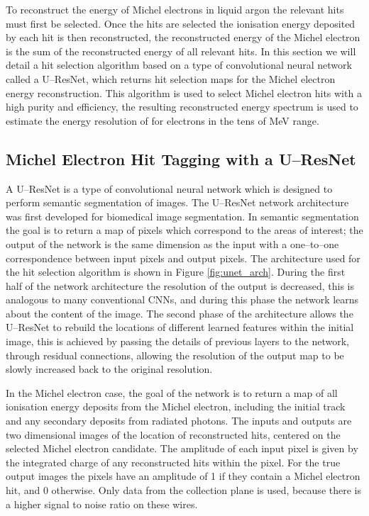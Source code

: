 To reconstruct the energy of Michel electrons in liquid argon the relevant hits
must first be selected. Once the hits are selected the ionisation energy
deposited by each hit is then reconstructed, the reconstructed energy of the 
Michel electron is the sum of the reconstructed energy of all relevant hits. In
this section we will detail a hit selection algorithm based on a type of
convolutional neural network called a U--ResNet, which returns hit selection maps 
for the Michel electron energy reconstruction. This algorithm is used to select 
Michel electron hits with a high purity and efficiency, the resulting 
reconstructed energy spectrum is used to estimate the energy resolution of 
\protodune{} for electrons in the tens of MeV range.

\subsection{Michel Electron Hit Tagging with a U--ResNet}

A U--ResNet is a type of convolutional neural network which is designed to perform
semantic segmentation of images. The U--ResNet network architecture was first 
developed for biomedical image segmentation\cite{ronneberger2015u}. In 
semantic segmentation the goal is to return a map of pixels which correspond 
to the areas of interest; the output of the network is the same dimension as 
the input with a one--to--one correspondence between input pixels and output 
pixels. The architecture used for the hit selection algorithm is shown in 
Figure \ref{fig:unet_arch}. During the first half of the network architecture 
the resolution of the output is decreased, this is analogous to many 
conventional CNNs, and during this phase the network learns about the content 
of the image. The second phase of the architecture allows the U--ResNet to 
rebuild the locations of different learned features within the initial image, 
this is achieved by passing the details of previous layers to the network,
through residual connections, allowing the resolution of the output map to be 
slowly increased back to the original resolution.

In the Michel electron case, the goal of the network is to return a map of all
ionisation energy deposits from the Michel electron, including the initial 
track and any secondary deposits from radiated photons. The inputs and outputs 
are two dimensional images of the location of reconstructed hits, centered on 
the selected Michel electron candidate. The amplitude of each input pixel is 
given by the integrated charge of any reconstructed hits within the pixel. For 
the true output images the pixels have an amplitude of 1 if they contain a 
Michel electron hit, and 0 otherwise. Only data from the collection plane is 
used, because there is a higher signal to noise ratio on these wires. 

